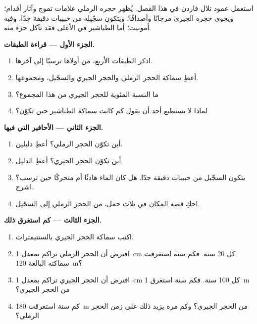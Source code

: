 \begin{problem}
\label{pb:g7:sediments-and-fossils:1}
استعمل عمود تلال فاردن في هذا الفصل. يُظهر حجره الرملي علامات تموج وآثار
أقدام؛ ويحوي حجره الجيري مرجانًا وأصدافًا؛ ويتكون سجّيله من حبيبات دقيقة
جدًا، وفيه أمونيت؛ أما الطباشير في الأعلى فقد تآكل جزء منه.

\medskip
\noindent\textbf{الجزء الأول --- قراءة الطبقات.}\par\nopagebreak
\begin{enumerate}[beginpenalty=10000]
  \item اذكر الطبقات الأربع، من أولاها ترسبًا إلى آخرها.
  \item أعطِ سماكة الحجر الرملي والحجر الجيري والسجّيل، ومجموعها.
  \item ما النسبة المئوية للحجر الجيري من هذا المجموع؟
  \item لماذا لا يستطيع أحد أن يقول كم كانت سماكة الطباشير حين تكوّن؟
\end{enumerate}

\medskip
\noindent\textbf{الجزء الثاني --- الأحافير التي فيها.}\par\nopagebreak
\begin{enumerate}[resume, beginpenalty=10000]
  \item أين تكوّن الحجر الرملي؟ أعطِ دليلين.
  \item أين تكوّن الحجر الجيري؟ أعطِ الدليل.
  \item يتكون السجّيل من حبيبات دقيقة جدًا. هل كان الماء هادئًا أم متحركًا
        حين ترسب؟ اشرح.
  \item احكِ قصة المكان في ثلاث جمل، من الحجر الرملي إلى السجّيل.
\end{enumerate}

\medskip
\noindent\textbf{الجزء الثالث --- كم استغرق ذلك.}\par\nopagebreak
\begin{enumerate}[resume, beginpenalty=10000]
  \item اكتب سماكة الحجر الجيري بالسنتيمترات.
  \item افترض أن الحجر الرملي تراكم بمعدل \qty{1}{cm} كل 20 سنة. فكم
        سنة استغرقت سماكته البالغة \qty{120}{m}؟
  \item افترض أن الحجر الجيري تراكم بمعدل \qty{1}{cm} كل 100 سنة.
        فكم سنة استغرق \qty{1}{m} من الحجر الجيري؟
  \item كم سنة استغرقت \qty{180}{m} من الحجر الجيري؟ وكم مرة يزيد ذلك
        على زمن الحجر الرملي؟
\end{enumerate}
\end{problem}
